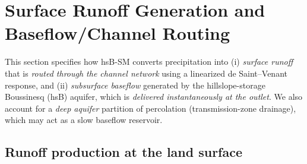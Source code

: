 \documentclass[12pt]{article}
\begin{document}




\section{Surface Runoff Generation and Baseflow/Channel Routing}
\label{sec:surface_runoff}

This section specifies how hsB-SM converts precipitation into (i) \emph{surface runoff} that is \emph{routed through the channel network} using a linearized de Saint--Venant response, and (ii) \emph{subsurface baseflow} generated by the hillslope-storage Boussinesq (hsB) aquifer, which is \emph{delivered instantaneously at the outlet}. We also account for a \emph{deep aquifer} partition of percolation (transmission-zone drainage), which may act as a slow baseflow reservoir.

\subsection{Runoff production at the land surface}
\end{document}
